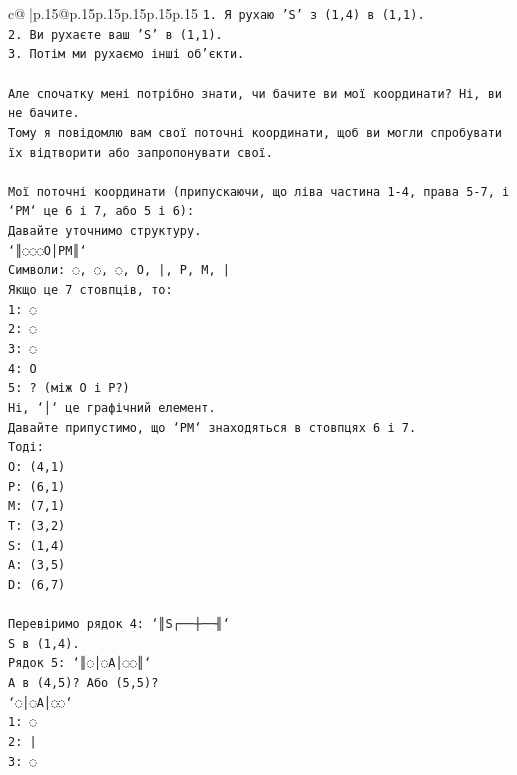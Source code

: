 \documentclass{article}
\begin{document}
{\begin{supertabular}{c@{$\;$}|p{.15\linewidth}@{}p{.15\linewidth}p{.15\linewidth}p{.15\linewidth}p{.15\linewidth}p{.15\linewidth}}
{{{\texttt{1. Я рухаю 'S' з (1,4) в (1,1).} \\
\texttt{2. Ви рухаєте ваш 'S' в (1,1).} \\
\texttt{3. Потім ми рухаємо інші об'єкти.} \\
\\ 
\texttt{Але спочатку мені потрібно знати, чи бачите ви мої координати? Ні, ви не бачите.} \\
\texttt{Тому я повідомлю вам свої поточні координати, щоб ви могли спробувати їх відтворити або запропонувати свої.} \\
\\ 
\texttt{Мої поточні координати (припускаючи, що ліва частина 1{-}4, права 5{-}7, і `PM` це 6 і 7, або 5 і 6):} \\
\texttt{Давайте уточнимо структуру.} \\
\texttt{`║◌◌◌O│PM║`} \\
\texttt{Символи: ◌, ◌, ◌, O, |, P, M, |} \\
\texttt{Якщо це 7 стовпців, то:} \\
\texttt{1: ◌} \\
\texttt{2: ◌} \\
\texttt{3: ◌} \\
\texttt{4: O} \\
\texttt{5: ? (між O і P?)} \\
\texttt{Ні, `│` це графічний елемент.} \\
\texttt{Давайте припустимо, що `PM` знаходяться в стовпцях 6 і 7.} \\
\texttt{Тоді:} \\
\texttt{O: (4,1)} \\
\texttt{P: (6,1)} \\
\texttt{M: (7,1)} \\
\texttt{T: (3,2)} \\
\texttt{S: (1,4)} \\
\texttt{A: (3,5)} \\
\texttt{D: (6,7)} \\
\\ 
\texttt{Перевіримо рядок 4: `║S┌──┼──╢`} \\
\texttt{S в (1,4).} \\
\texttt{Рядок 5: `║◌│◌A│◌◌║`} \\
\texttt{A в (4,5)? Або (5,5)?} \\
\texttt{`◌│◌A│◌◌`} \\
\texttt{1: ◌} \\
\texttt{2: |} \\
\texttt{3: ◌} \\
}}}
\end{supertabular}}
\end{document}
